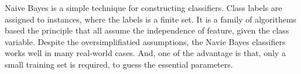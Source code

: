 \documentclass[12pt,a4paper]{article}
\begin{document}
    Naive Bayes is a simple technique for constructing classifiers. Class labels are assigned to instances, where the labels is a finite set. It is a family of algorithems based the principle that all assume the independence of feature, given the class variable. Despite the oversimplifiatied assumptions, the Navie Bayes classifiers works well in many real-world cases. And, one of the advantage is that, only a small training set is required, to guess the essential parameters. \cite{wiki:naive_bayes_classifier}












\end{document}
